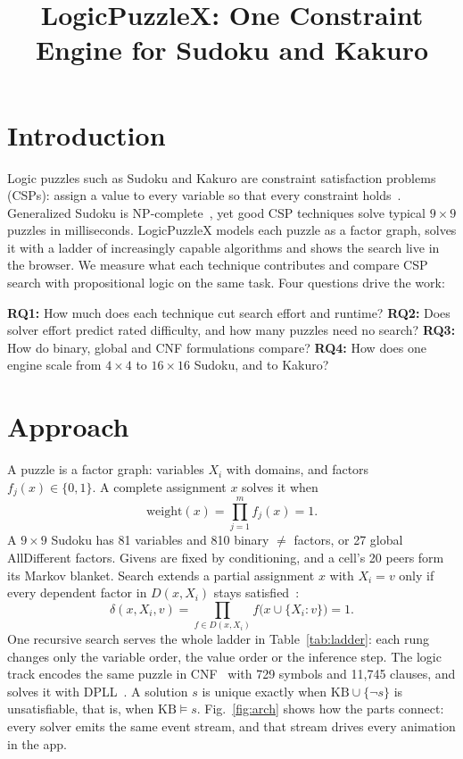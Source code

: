 \documentclass[conference]{IEEEtran}
\begin{document}
\title{LogicPuzzleX: One Constraint Engine for Sudoku and Kakuro}
\author{
}
\maketitle

\section{Introduction}
Logic puzzles such as Sudoku and Kakuro are constraint satisfaction problems (CSPs): assign a value to every variable so that every constraint holds~\cite{aima}. Generalized Sudoku is NP-complete~\cite{yato}, yet good CSP techniques solve typical $9\times9$ puzzles in milliseconds. LogicPuzzleX models each puzzle as a factor graph, solves it with a ladder of increasingly capable algorithms and shows the search live in the browser. We measure what each technique contributes and compare CSP search with propositional logic on the same task. Four questions drive the work:

\noindent\textbf{RQ1:} How much does each technique cut search effort and runtime?
\textbf{RQ2:} Does solver effort predict rated difficulty, and how many puzzles need no search?
\textbf{RQ3:} How do binary, global and CNF formulations compare?
\textbf{RQ4:} How does one engine scale from $4\times4$ to $16\times16$ Sudoku, and to Kakuro?

\section{Approach}
A puzzle is a factor graph: variables $X_i$ with domains, and factors $f_j(x)\in\{0,1\}$. A complete assignment $x$ solves it when
\begin{equation}
  \mathrm{weight}(x)=\prod_{j=1}^{m} f_j(x)=1 .
\end{equation}
A $9\times9$ Sudoku has 81 variables and 810 binary $\neq$ factors, or 27 global AllDifferent factors. Givens are fixed by conditioning, and a cell's 20 peers form its Markov blanket. Search extends a partial assignment $x$ with $X_i=v$ only if every dependent factor in $D(x,X_i)$ stays satisfied~\cite{notes}:
\begin{equation}
  \delta(x,X_i,v)=\prod_{f\in D(x,X_i)} f\bigl(x\cup\{X_i:v\}\bigr)=1 .
\end{equation}
One recursive search serves the whole ladder in Table~\ref{tab:ladder}: each rung changes only the variable order, the value order or the inference step. The logic track encodes the same puzzle in CNF~\cite{lynce} with 729 symbols and 11,745 clauses, and solves it with DPLL~\cite{dpll}. A solution $s$ is unique exactly when $\mathrm{KB}\cup\{\neg s\}$ is unsatisfiable, that is, when $\mathrm{KB}\models s$. Fig.~\ref{fig:arch} shows how the parts connect: every solver emits the same event stream, and that stream drives every animation in the app.
\end{document}
